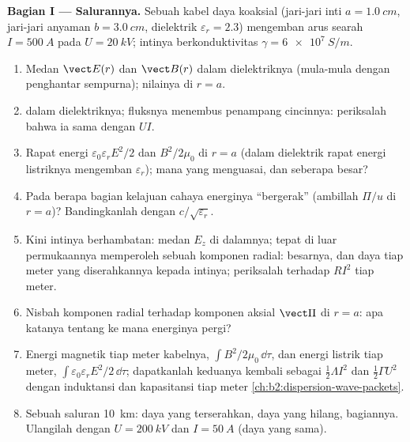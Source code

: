 \begin{problem}
\label{pb:b2:poynting-vector:1}

\medskip
\noindent\textbf{Bagian I --- Salurannya.}
Sebuah kabel daya koaksial (jari-jari inti $a = \qty{1.0}{cm}$, jari-jari anyaman $b =
\qty{3.0}{cm}$, dielektrik $\varepsilon_r = 2.3$) mengemban arus searah $I =
\qty{500}{A}$ pada $U = \qty{20}{kV}$; intinya berkonduktivitas $\gamma =
\qty{6e7}{S/m}$.
\begin{enumerate}
  \item Medan $\vect E(r)$ dan $\vect B(r)$ dalam dielektriknya (mula-mula dengan
        penghantar sempurna); nilainya di $r = a$.
  \item {} dalam dielektriknya; fluksnya menembus
        penampang cincinnya: periksalah bahwa ia sama dengan $UI$.
  \item Rapat energi $\varepsilon_0\varepsilon_rE^2/2$ dan $B^2/2\mu_0$ di $r = a$
        (dalam dielektrik rapat energi listriknya mengemban $\varepsilon_r$);
        mana yang menguasai, dan seberapa besar?
  \item Pada berapa bagian kelajuan cahaya energinya ``bergerak''
        (ambillah $\Pi/u$ di $r = a$)? Bandingkanlah dengan $c/\sqrt{\varepsilon_r}$.
  \item Kini intinya berhambatan: medan $E_z$ di dalamnya;
         tepat di luar permukaannya memperoleh sebuah komponen
        radial: besarnya, dan daya tiap meter yang diserahkannya kepada
        intinya; periksalah terhadap $RI^2$ tiap meter.
  \item Nisbah komponen radial terhadap komponen aksial $\vect\Pi$ di $r =
        a$: apa katanya tentang ke mana energinya pergi?
  \item Energi magnetik tiap meter kabelnya, $\int B^2/2\mu_0\,\dd\tau$, dan
        energi listrik tiap meter, $\int\varepsilon_0\varepsilon_rE^2/2\,\dd\tau$;
        dapatkanlah keduanya kembali sebagai $\tfrac12\Lambda I^2$ dan $\tfrac12\Gamma U^2$ dengan
        induktansi dan kapasitansi tiap meter \cref{ch:b2:dispersion-wave-packets}.
  \item Sebuah saluran \qty{10}{km}: daya yang terserahkan, daya yang hilang, bagiannya.
        Ulangilah dengan $U = \qty{200}{kV}$ dan $I = \qty{50}{A}$ (daya yang sama).
\end{enumerate}


\end{problem}
